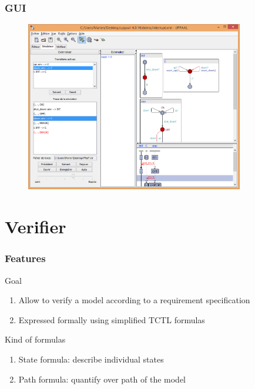 \documentclass{beamer}
\begin{document}
\begin{frame}
	\frametitle{GUI}
	\begin{figure}
    	\centering
    	\includegraphics[width = 0.85\textwidth]{uppaal_simulator.png}
  	\end{figure}
\end{frame}


\section{Verifier}
\begin{frame}
	\frametitle{Features}
	\begin{block}{Goal}
		\begin{enumerate}
			\item Allow to verify a model according to a requirement specification
			\item Expressed formally using simplified TCTL formulas
		\end{enumerate}
	\end{block}
	
	\begin{block}{Kind of formulas}
		\begin{enumerate}
			\item State formula: describe individual states
			\item Path formula: quantify over path of the model
		\end{enumerate}
	\end{block}
	
\end{frame}
\end{document}
